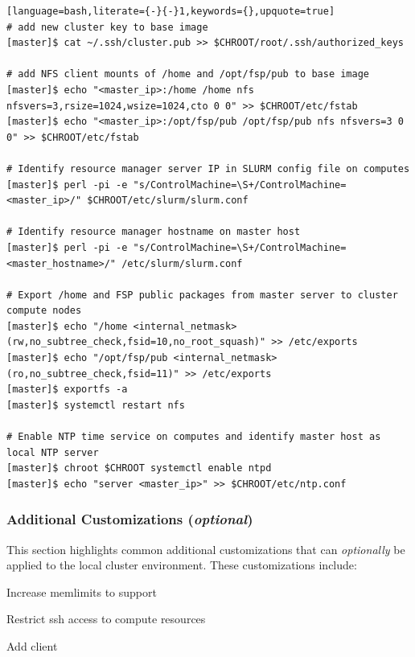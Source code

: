 \documentclass[letterpaper]{article}
\begin{document}
\begin{lstlisting}[language=bash,literate={-}{-}1,keywords={},upquote=true]
# add new cluster key to base image
[master]$ cat ~/.ssh/cluster.pub >> $CHROOT/root/.ssh/authorized_keys

# add NFS client mounts of /home and /opt/fsp/pub to base image
[master]$ echo "<master_ip>:/home /home nfs nfsvers=3,rsize=1024,wsize=1024,cto 0 0" >> $CHROOT/etc/fstab
[master]$ echo "<master_ip>:/opt/fsp/pub /opt/fsp/pub nfs nfsvers=3 0 0" >> $CHROOT/etc/fstab

# Identify resource manager server IP in SLURM config file on computes
[master]$ perl -pi -e "s/ControlMachine=\S+/ControlMachine=<master_ip>/" $CHROOT/etc/slurm/slurm.conf

# Identify resource manager hostname on master host
[master]$ perl -pi -e "s/ControlMachine=\S+/ControlMachine=<master_hostname>/" /etc/slurm/slurm.conf

# Export /home and FSP public packages from master server to cluster compute nodes
[master]$ echo "/home <internal_netmask>(rw,no_subtree_check,fsid=10,no_root_squash)" >> /etc/exports
[master]$ echo "/opt/fsp/pub <internal_netmask>(ro,no_subtree_check,fsid=11)" >> /etc/exports
[master]$ exportfs -a
[master]$ systemctl restart nfs

# Enable NTP time service on computes and identify master host as local NTP server
[master]$ chroot $CHROOT systemctl enable ntpd
[master]$ echo "server <master_ip>" >> $CHROOT/etc/ntp.conf
\end{lstlisting}

\newpage
\subsubsection{Additional Customizations ({\em optional})}

This section highlights common additional customizations that
can {\em optionally} be applied to the
local cluster environment. These customizations include:

\begin{itemize*}
\item Increase memlimits to support \InfiniBand{}
\item Restrict ssh access to compute resources
\item Add \Lustre{} client
\end{itemize*}
\end{document}
